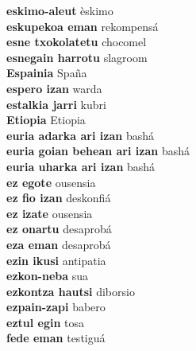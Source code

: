 \textbf{ eskimo-aleut  } èskimo \\
\textbf{ eskupekoa eman  } rekompensá \\
\textbf{ esne txokolatetu  } chocomel \\
\textbf{ esnegain harrotu  } slagroom \\
\textbf{ Espainia  } Spaña \\
\textbf{ espero izan  } warda \\
\textbf{ estalkia jarri  } kubri \\
\textbf{ Etiopia  } Etiopia \\
\textbf{ euria adarka ari izan  } bashá \\
\textbf{ euria goian behean ari izan  } bashá \\
\textbf{ euria uharka ari izan  } bashá \\
\textbf{ ez egote  } ousensia \\
\textbf{ ez fio izan  } deskonfiá \\
\textbf{ ez izate  } ousensia \\
\textbf{ ez onartu  } desaprobá \\
\textbf{ eza eman  } desaprobá \\
\textbf{ ezin ikusi  } antipatia \\
\textbf{ ezkon-neba  } sua \\
\textbf{ ezkontza hautsi  } diborsio \\
\textbf{ ezpain-zapi  } babero \\
\textbf{ eztul egin  } tosa \\
\textbf{ fede eman  } testiguá \\
